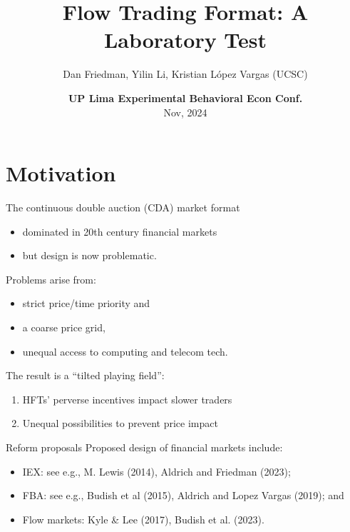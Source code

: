 \documentclass[10pt]{beamer}
\title[FlowTrading]{Flow Trading Format: A Laboratory Test}
\author[DF-YL-KL]{Dan Friedman, Yilin Li, Kristian L\'opez Vargas (UCSC)}
\institute[UCSC]{}
\date[4/27/2024]{\vspace{1cm} \textbf{UP Lima Experimental Behavioral Econ Conf.} \\
Nov, 2024}
\begin{document}
\maketitle


\section{Motivation}
\begin{frame}{
The continuous double auction (CDA) market format}
\begin{itemize}
\item dominated in 20th century financial markets 
\item but design is now problematic.  %
\end{itemize}
Problems arise from:
\begin{itemize}
\item strict price/time priority and 
\item a coarse price grid, 
\item unequal access to computing and telecom tech.

\end{itemize} %
The result is a ``tilted playing field'': 
\begin{enumerate}
\item HFTs' perverse incentives impact slower traders
\item Unequal possibilities to prevent price impact
   \end{enumerate}
\end{frame}

\begin{frame}{Reform proposals}
Proposed design of financial markets include:
    \begin{itemize}
\item IEX: see e.g., M. Lewis (2014), Aldrich and Friedman (2023); %
\item FBA: see e.g., Budish et al (2015), Aldrich and Lopez Vargas (2019); and %
\item Flow markets:  Kyle \& Lee (2017), Budish et al. (2023).
\end{itemize}
\end{frame}
\end{document}
